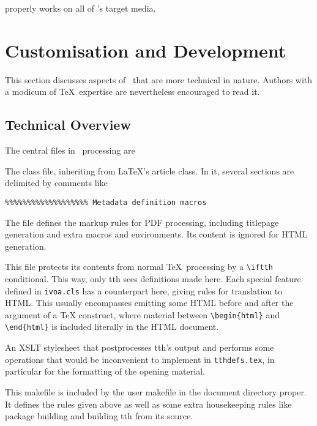 \documentclass[11pt,a4paper]{ivoa}
\begin{document}
properly works on all of \ivoatex's target media.

\section{Customisation and Development}
\label{sect:impl}

This section discusses aspects of \ivoatex\ that are more technical in
nature.  Authors with a modicum of \TeX\ expertise are nevertheless
encouraged to read it.

\subsection{Technical Overview}

The central files in \ivoatex\ processing are

\begin{bigdescription}
\item[ivoa.cls] The class file, inheriting from \LaTeX's article class.
In it, several sections are delimited by comments like

\begin{lstlisting}
%%%%%%%%%%%%%%%%%%% Metadata definition macros
\end{lstlisting}

The file defines the markup rules for PDF processing, including
titlepage generation and extra macros and environments.  Its content is
ignored for HTML generation.

\item[tthdefs.tex] This file protects its contents from normal \TeX\
processing by a \verb|\iftth| conditional. This way, only tth sees
definitions made here. Each special feature defined in \texttt{ivoa.cls}
has a counterpart here, giving rules for translation to HTML.  This
usually encompasses emitting some HTML before and after the argument of
a TeX construct, where material between \verb|\begin{html}| and
\verb|\end{html}| is included literally in the HTML document.

\item[tth-ivoa.xslt] An XSLT stylesheet that postprocesses tth's output
and performs some operations that would be inconvenient to implement in
\texttt{tthdefs.tex}, in particular for the formatting of the opening
material.

\item[Makefile] This makefile is included by the user makefile in the
document directory proper.  It defines the rules given above as well as
some extra housekeeping rules like package building and building tth
from its source.

\end{bigdescription}
\end{document}

